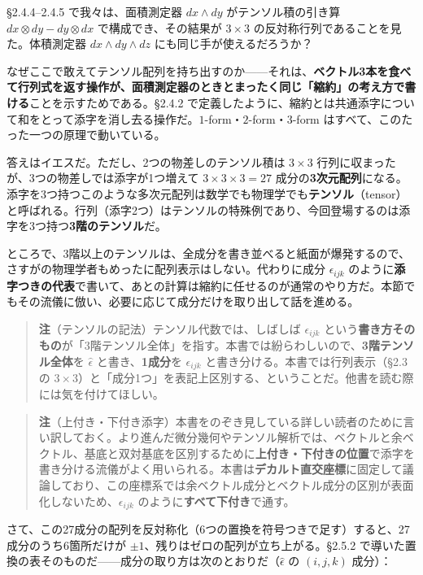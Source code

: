\documentclass[a4paper,12pt,openany]{book}
\begin{document}
§2.4.4–2.4.5 で我々は、面積測定器 \(dx \wedge dy\) がテンソル積の引き算
\(dx \otimes dy - dy \otimes dx\) で構成でき、その結果が \(3 \times 3\)
の反対称行列であることを見た。体積測定器 \(dx \wedge dy \wedge dz\)
にも同じ手が使えるだろうか？

なぜここで敢えてテンソル配列を持ち出すのか——それは、\textbf{ベクトル3本を食べて行列式を返す操作が、面積測定器のときとまったく同じ「縮約」の考え方で書ける}ことを示すためである。§2.4.2
で定義したように、縮約とは共通添字について和をとって添字を消し去る操作だ。\(1\)-form・\(2\)-form・\(3\)-form
はすべて、このたった一つの原理で動いている。

答えはイエスだ。ただし、2つの物差しのテンソル積は \(3 \times 3\)
行列に収まったが、3つの物差しでは添字が1つ増えて
\(3 \times 3 \times 3 = 27\)
成分の\textbf{3次元配列}になる。添字を3つ持つこのような多次元配列は数学でも物理学でも\textbf{テンソル}（tensor）と呼ばれる。行列（添字2つ）はテンソルの特殊例であり、今回登場するのは添字を3つ持つ\textbf{3階のテンソル}だ。

ところで、3階以上のテンソルは、全成分を書き並べると紙面が爆発するので、さすがの物理学者もめったに配列表示はしない。代わりに成分
\(\epsilon_{ijk}\)
のように\textbf{添字つきの代表}で書いて、あとの計算は縮約に任せるのが通常のやり方だ。本節でもその流儀に倣い、必要に応じて成分だけを取り出して話を進める。

\begin{quote}
\textbf{注}（テンソルの記法）テンソル代数では、しばしば
\(\epsilon_{ijk}\)
という\textbf{書き方そのもの}が「3階テンソル全体」を指す。本書では紛らわしいので、\textbf{3階テンソル全体}を
\(\widehat{\epsilon}\) と書き、\textbf{1成分}を \(\epsilon_{ijk}\)
と書き分ける。本書では行列表示（§2.3 の
\(3\times3\)）と「成分1つ」を表記上区別する、ということだ。他書を読む際には気を付けてほしい。
\end{quote}

\begin{quote}
\textbf{注}（上付き・下付き添字）本書をのぞき見している詳しい読者のために言い訳しておく。より進んだ微分幾何やテンソル解析では、ベクトルと余ベクトル、基底と双対基底を区別するために\textbf{上付き・下付きの位置}で添字を書き分ける流儀がよく用いられる。本書は\textbf{デカルト直交座標}に固定して議論しており、この座標系では余ベクトル成分とベクトル成分の区別が表面化しないため、\(\epsilon_{ijk}\)
のように\textbf{すべて下付き}で通す。
\end{quote}

さて、この27成分の配列を反対称化（6つの置換を符号つきで足す）すると、27成分のうち6箇所だけが
\(\pm 1\)、残りはゼロの配列が立ち上がる。§2.5.2
で導いた置換の表そのものだ——成分の取り方は次のとおりだ（\(\widehat{\epsilon}\)
の \((i,j,k)\) 成分）：
\end{document}
